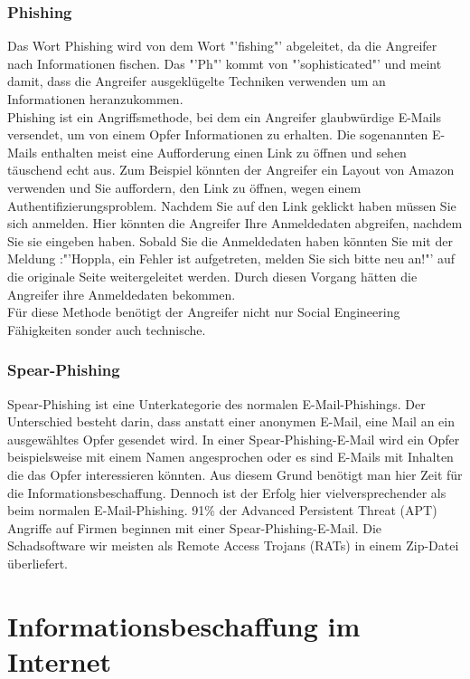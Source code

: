 		\subsubsection{Phishing}
		Das Wort Phishing wird von dem Wort "'fishing"' abgeleitet, da die Angreifer nach Informationen fischen. Das "'Ph"' kommt von "'sophisticated"' und meint damit, dass die Angreifer ausgeklügelte Techniken verwenden um an Informationen heranzukommen.\cite{PhishingExposed}\\
		Phishing ist ein Angriffsmethode, bei dem ein Angreifer glaubwürdige E-Mails versendet, um von einem Opfer Informationen zu erhalten. Die sogenannten E-Mails enthalten meist eine Aufforderung einen Link zu öffnen und sehen täuschend echt aus. Zum Beispiel könnten der Angreifer ein Layout von Amazon verwenden und Sie auffordern, den Link zu öffnen, wegen einem Authentifizierungsproblem. Nachdem Sie auf den Link geklickt haben müssen Sie sich anmelden. Hier könnten die Angreifer Ihre Anmeldedaten abgreifen, nachdem Sie sie eingeben haben. Sobald Sie die Anmeldedaten haben könnten Sie mit der Meldung :"'Hoppla, ein Fehler ist aufgetreten, melden Sie sich bitte neu an!"' auf die originale Seite weitergeleitet werden. Durch diesen Vorgang hätten die Angreifer ihre Anmeldedaten bekommen.\\
		Für diese Methode benötigt der Angreifer nicht nur Social Engineering Fähigkeiten sonder auch technische.\cite{PhishingDarkWaters}
		
		\subsubsection{Spear-Phishing}
		Spear-Phishing ist eine Unterkategorie des normalen E-Mail-Phishings. Der Unterschied besteht darin, dass anstatt einer anonymen E-Mail, eine Mail an ein ausgewähltes Opfer gesendet wird. In einer Spear-Phishing-E-Mail wird ein Opfer beispielsweise mit einem Namen angesprochen oder es sind E-Mails mit Inhalten die das Opfer interessieren könnten. Aus diesem Grund benötigt man hier Zeit für die Informationsbeschaffung. Dennoch ist der Erfolg hier vielversprechender als beim normalen E-Mail-Phishing.
		91\% der Advanced Persistent Threat (APT) Angriffe auf Firmen beginnen mit einer Spear-Phishing-E-Mail. Die Schadsoftware wir meisten als Remote Access Trojans (RATs) in einem Zip-Datei überliefert.\cite{SpearPhishing}


\section{Informationsbeschaffung im Internet}
